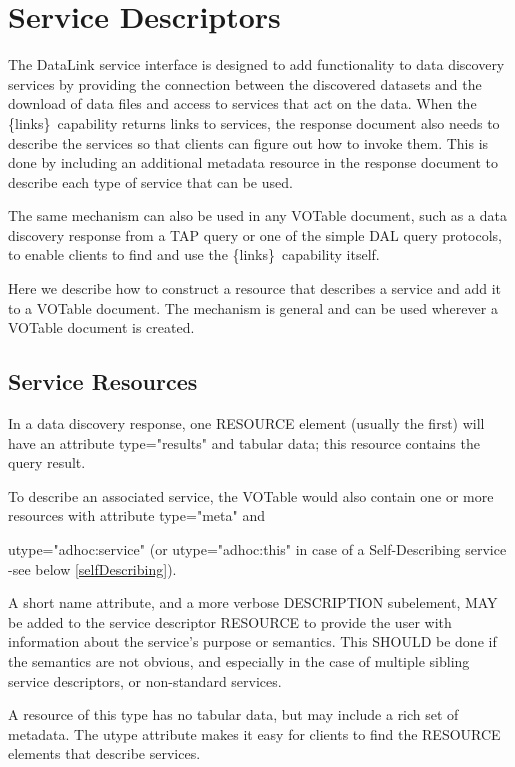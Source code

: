 \documentclass[11pt,a4paper]{ivoa}
\newcommand{\blinks}{\{links\}}
\newcommand{\attval}[2]{#1={\allowbreak}{"}#2{"}}
\begin{document}
\section{Service Descriptors}
\label{sec:serviceDescriptors}

The DataLink service interface is designed to add functionality to data
discovery services by providing the connection between the discovered
datasets and the download of data files and access to services that act
on the data. When the \blinks\ capability returns links to services, the
response document also needs to describe the services so that clients can
figure out how to invoke them. This is done by including an additional
metadata resource in the response document to describe each type of
service that can be used.

The same mechanism can also be used in any VOTable document, such
as a data discovery response from a TAP query or one of the simple
DAL query protocols, to enable clients to find and use the \blinks\
capability itself.

Here we describe how to construct a resource that describes a service
and add it to a VOTable document. The mechanism is general and can be
used wherever a VOTable document is created.


\subsection{Service Resources}
\label{sec:serviceResources}

In a data discovery response, one RESOURCE element (usually the first)
will have an attribute \attval{type}{results} and tabular data; this resource
contains the query result.

To describe an associated service, the VOTable would also
contain one or more resources with attribute \attval{type}{meta} and

\attval{utype}{adhoc:service}  (or \attval{utype}{adhoc:this} in case of
a Self-Describing service -see below \ref{selfDescribing}).

A short name attribute, and a more verbose DESCRIPTION  subelement,
MAY be added to the service descriptor RESOURCE to  provide the user
with information about the service's purpose or  semantics. This SHOULD
be done if the semantics are not obvious,  and especially in the case
of multiple sibling service  descriptors, or non-standard services.



A resource of this type has no tabular data,
but may include a rich set of metadata. The utype attribute makes it
easy for clients to find the RESOURCE elements that describe services.
\end{document}
